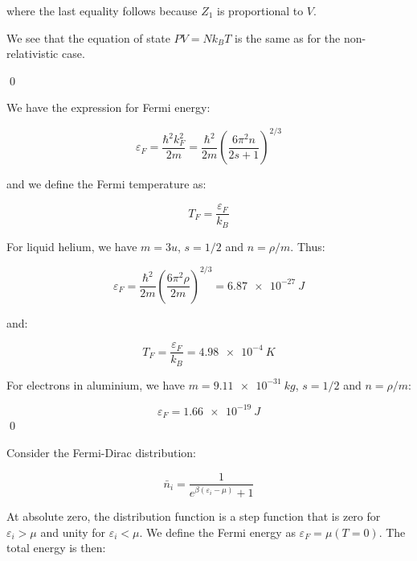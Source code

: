 \documentclass[12pt]{article}
\begin{document}
where the last equality follows because $Z_{1}$ is proportional to $V$.

We see that the equation of state $PV = Nk_{B}T$ is the same as for the non-relativistic case.


\qed


We have the expression for Fermi energy:

\begin{equation}
    \varepsilon_{F} = \frac{\hbar^{2} k_{F}^{2}}{2m} = \frac{\hbar^{2}}{2m} \left( \frac{6\pi^{2} n}{2s + 1} \right)^{2/3}
\end{equation}

and we define the Fermi temperature as:

\begin{equation}
    T_{F} = \frac{\varepsilon_{F}}{k_{B}}
\end{equation}

For liquid helium, we have $m = 3u$, $s = 1/2$ and $n = \rho/m$. Thus:

\begin{equation}
    \varepsilon_{F} = \frac{\hbar^{2}}{2m} \left( \frac{6\pi^{2} \rho}{2m} \right)^{2/3} = \qty{6.87e-27}{J}
\end{equation}

and:

\begin{equation}
    T_{F} = \frac{\varepsilon_{F}}{k_{B}} = \qty{4.98e-4}{K}
\end{equation}

For electrons in aluminium, we have $m = \qty{9.11e-31}{kg}$, $s = 1/2$ and $n = \rho/m$:

\begin{equation}
    \varepsilon_{F} = \qty{1.66e-19}{J}
\end{equation}
\qed



Consider the Fermi-Dirac distribution:

\begin{equation}
    \bar{n}_{i} = \frac{1}{e^{\beta (\varepsilon_{i} - \mu)} + 1}
\end{equation}

At absolute zero, the distribution function is a step function that is zero for $\varepsilon_{i} > \mu$ and unity for $\varepsilon_{i} < \mu$. We define the Fermi energy as $\varepsilon_{F} = \mu(T = 0)$. The total energy is then:
\end{document}
